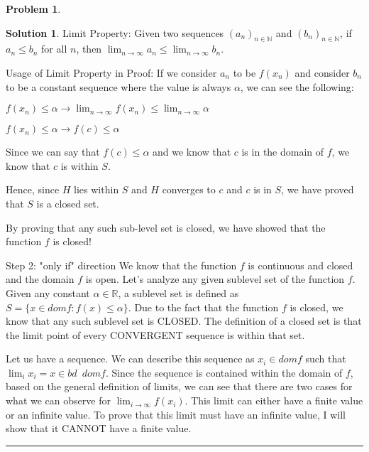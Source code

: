 \documentclass{article}
\theoremstyle{definition}
\newtheorem{problem}{Problem}
\def\fline{\rule{0.75\linewidth}{0.5pt}}
\newcommand{\finishline}{\begin{center}\fline\end{center}}
\newtheorem*{solution*}{Solution}
\newenvironment{solution}{\begin{solution*}}{{\finishline} \end{solution*}}
\begin{document}
\begin{problem}
\begin{solution}
Limit Property: \newline 
Given two sequences $(a_n)_{n \in \mathbb{N}}$ and $(b_n)_{n \in \mathbb{N}}$, if $a_n \leq b_n$ for all $n$, then  $\lim_{n\to\infty} a_n \leq \lim_{n\to\infty} b_n$. 

Usage of Limit Property in Proof: \newline 
If we consider $a_n$ to be $f(x_n)$ and consider $b_n$ to be a constant sequence where the value is always $\alpha$, we can see the following: \newline 

$f(x_n) \leq \alpha \rightarrow \lim_{n\to\infty} f(x_n) \leq \lim_{n\to\infty} \alpha$ \newline 

$f(x_n) \leq \alpha \rightarrow f(c) \leq \alpha$ \newline 

Since we can say that $f(c) \leq \alpha$ and we know that $c$ is in the domain of $f$, we know that $c$ is within $S$. \newline 


Hence, since $H$ lies within $S$ and $H$ converges to $c$ and $c$ is in $S$, we have proved that $S$ is a closed set. \newline 


By proving that any such sub-level set is closed, we have showed that the function $f$ is closed! \newline 




Step 2: "only if" direction \newline 
We know that the function $f$ is continuous and closed and the domain $f$ is open. Let's analyze any given sublevel set of the function $f$. Given any constant $\alpha \in \mathbb{R}$, a sublevel set is defined as $S = \{x \in dom f : f(x) \leq \alpha \}$. Due to the fact that the function $f$ is closed, we know that any such sublevel set is CLOSED. The definition of a closed set is that the limit point of every CONVERGENT sequence is within that set. 

Let us have a sequence. We can describe this sequence as $x_i \in dom f$ such that $\lim_{i} x_i = x \in bd \enspace dom f$. Since the sequence is contained within the domain of $f$, based on the general definition of limits, we can see that there are two cases for what we can observe for $\lim_{i\to\infty} f(x_i)$. This limit can either have a finite value or an infinite value. To prove that this limit must have an infinite value, I will show that it CANNOT have a finite value. \newline 


\end{solution}
\end{problem}
\end{document}
